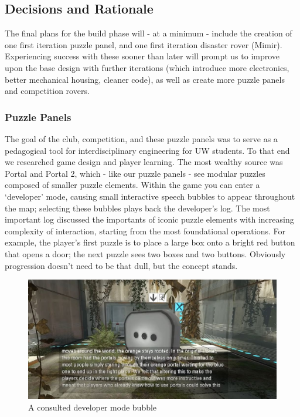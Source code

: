\documentclass[a4paper, 10pt]{article}
\begin{document}
	\subsection{Decisions and Rationale}
	The final plans for the build phase will - at a minimum - include the creation of one first iteration puzzle panel, and one first iteration disaster rover (Mimir). Experiencing success with these sooner than later will prompt us to improve upon the base design with further iterations (which introduce more electronics, better mechanical housing, cleaner code), as well as create more puzzle panels and competition rovers.
	
		\subsubsection*{Puzzle Panels}
		The goal of the club, competition, and these puzzle panels was to serve as a pedagogical tool for interdisciplinary engineering for UW students. To that end we researched game design and player learning. The most wealthy source was Portal and Portal 2, which - like our puzzle panels - see modular puzzles composed of smaller puzzle elements. Within the game you can enter a `developer' mode, causing small interactive speech bubbles to appear throughout the map; selecting these bubbles plays back the developer's log. The most important log discussed the importants of iconic puzzle elements with increasing complexity of interaction, starting from the most foundational operations. For example, the player's first puzzle is to place a large box onto a bright red button that opens a door; the next puzzle sees two boxes and two buttons. Obviously progression doesn't need to be that dull, but the concept stands.
		
		\begin{figure} [!h]
			\centering
			\includegraphics[scale=0.5]{Photos/portal 2}
			\caption{A consulted developer mode bubble}
			\label{dev_bubble}
		\end{figure}
		
\end{document}
